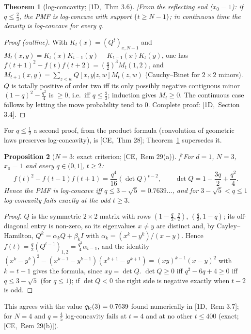 \documentclass[10pt,a4paper]{article}
\theoremstyle{plain}
\newtheorem{theorem}{Theorem}[section]
\newtheorem{proposition}[theorem]{Proposition}
\theoremstyle{definition}
\newcommand{\NEW}{\ensuremath{^{\dagger}}}       %
\newcommand{\src}[2]{[\textsf{#1},~#2]}           %
\newcommand{\ONE}{\textsf{1D}}
\newcommand{\CER}{\textsf{CE}}
\begin{document}
\begin{theorem}[log-concavity; \src{\ONE}{Thm 3.6}]\label{thm:1d-logconcave}
From the reflecting end ($x_0=1$): if $q\le\frac23$, the PMF is log-concave with support $\{t\ge N-1\}$; in continuous time the density is log-concave for every $q$.
\end{theorem}
\begin{proof}[Proof (outline)]
With $K_t(x)=(Q^t)_{x,N-1}$ and $M_t(x,y)=K_t(x)K_{t-1}(y)-K_{t-1}(x)K_t(y)$, one has $f(t+1)^2-f(t)f(t+2)=(\frac q2)^3M_t(1,2)$, and $M_{t+1}(x,y)=\sum_{z<w}Q[x,y|z,w]M_t(z,w)$ (Cauchy--Binet for $2\times2$ minors). $Q$ is totally positive of order two iff its only possibly negative contiguous minor $(1-q)^2-\frac{q^2}4$ is $\ge0$, i.e.\ iff $q\le\frac23$; induction gives $M_t\ge0$. The continuous case follows by letting the move probability tend to $0$. Complete proof: \src{\ONE}{Section 3.4}.
\end{proof}
For $q\le\frac12$ a second proof, from the product formula (convolution of geometric laws preserves log-concavity), is \src{\CER}{Thm 28}; Theorem~\ref{thm:1d-logconcave} supersedes it.

\begin{proposition}[$N=3$: exact criterion; \src{\CER}{Rem 29(a)}]\NEW\label{prop:N3lc}
For $d=1$, $N=3$, $x_0=1$ and every $q\in(0,1]$, $t\ge2$:
\[
f(t)^2-f(t-1)f(t+1)=\frac{q^4}{16}(\det Q)^{t-2},\qquad \det Q=1-\frac{3q}2+\frac{q^2}4 .
\]
Hence the PMF is log-concave iff $q\le3-\sqrt5=0.7639\ldots$, and for $3-\sqrt5<q\le1$ log-concavity fails exactly at the odd $t\ge3$.
\end{proposition}
\begin{proof}
$Q$ is the symmetric $2\times2$ matrix with rows $(1-\frac q2,\frac q2)$, $(\frac q2,1-q)$; its off-diagonal entry is non-zero, so its eigenvalues $x\ne y$ are distinct and, by Cayley--Hamilton, $Q^k=\alpha_kQ+\beta_kI$ with $\alpha_k=(x^k-y^k)/(x-y)$. Hence $f(t)=\frac q2(Q^{t-1})_{1,2}=\frac{q^2}4\alpha_{t-1}$, and the identity $(x^k-y^k)^2-(x^{k-1}-y^{k-1})(x^{k+1}-y^{k+1})=(xy)^{k-1}(x-y)^2$ with $k=t-1$ gives the formula, since $xy=\det Q$. $\det Q\ge0$ iff $q^2-6q+4\ge0$ iff $q\le3-\sqrt5$ (for $q\le1$); if $\det Q<0$ the right side is negative exactly when $t-2$ is odd.
\end{proof}
This agrees with the value $q_{\rm lc}(3)=0.7639$ found numerically in \src{\ONE}{Rem 3.7}; for $N=4$ and $q=\frac45$ log-concavity fails at $t=4$ and at no other $t\le400$ (exact; \src{\CER}{Rem 29(b)}).
\end{document}
